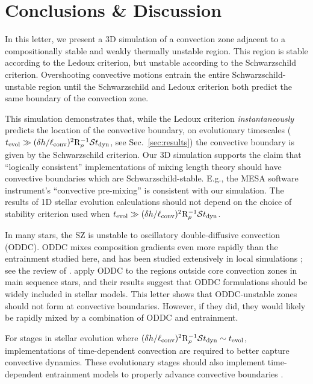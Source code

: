 \section{Conclusions \& Discussion}
\label{sec:conclusions}

In this letter, we present a 3D simulation of a convection zone adjacent to a compositionally stable and weakly thermally unstable region.
This region is stable according to the Ledoux criterion, but unstable according to the Schwarzschild criterion.
Overshooting convective motions entrain the entire Schwarzschild-unstable region until the Schwarzschild and Ledoux criterion both predict the same boundary of the convection zone.

This simulation demonstrates that, while the Ledoux criterion \emph{instantaneously} predicts the location of the convective boundary, on evolutionary timescales ($t_{\rm{evol}} \gg (\delta h / \ell_{\rm{conv}})^2\mathrm{R}_{\rho}^{-1}\mathcal{S} t_{\rm{dyn}}$, see Sec.~\ref{sec:results}) the convective boundary is given by the Schwarzschild criterion.
Our 3D simulation supports the claim that ``logically consistent'' implementations of mixing length theory \citep{gabriel_etal_2014, mesa4, mesa5} should have convective boundaries which are Schwarzschild-stable.
E.g., the MESA software instrument's ``convective pre-mixing'' \citep[CPM,][]{mesa5} is consistent with our simulation.
The results of 1D stellar evolution calculations should not depend on the choice of stability criterion used when $t_{\rm{evol}} \gg (\delta h / \ell_{\rm{conv}})^2\mathrm{R}_{\rho}^{-1}\mathcal{S} t_{\rm{dyn}}$.

In many stars, the SZ is unstable to oscillatory double-diffusive convection (ODDC).
ODDC mixes composition gradients even more rapidly than the entrainment studied here, and has been studied extensively in local simulations \citep{mirouh_etal_2012, wood_etal_2013, xie_etal_2017}; see the review of \citet{garaud_2018}.
\citet{moore_garaud_2016} apply ODDC to the regions outside core convection zones in main sequence stars, and their results suggest that ODDC formulations should be widely included in stellar models.
This letter shows that ODDC-unstable zones should not form at convective boundaries.
However, if they did, they would likely be rapidly mixed by a combination of ODDC and entrainment.

For stages in stellar evolution where $(\delta h / \ell_{\rm{conv}})^2\mathrm{R}_{\rho}^{-1}\mathcal{S} t_{\rm{dyn}} \sim t_{\rm{evol}}$, implementations of time-dependent convection \citep[TDC,][]{tdc_1986} are required to better capture convective dynamics.
These evolutionary stages should also implement time-dependent entrainment models to properly advance convective boundaries \citep[e.g.,][]{turner_1968, fuentes_cumming_2020}.

